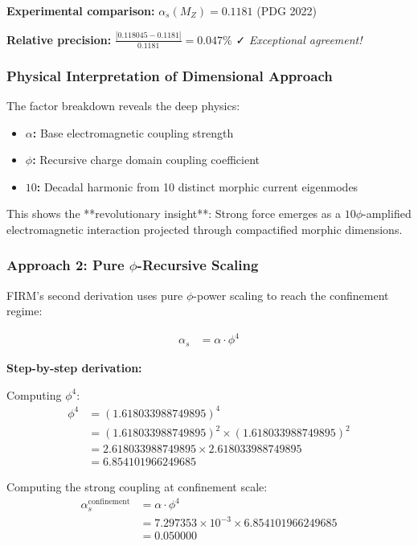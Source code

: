 \textbf{Experimental comparison:} $\alpha_s(M_Z) = 0.1181$ (PDG 2022)

\textbf{Relative precision:} $\frac{|0.118045 - 0.1181|}{0.1181} = 0.047\%$ ✓ \textit{Exceptional agreement!}

\subsubsection{Physical Interpretation of Dimensional Approach}

The factor breakdown reveals the deep physics:

\begin{itemize}
\item \textbf{$\alpha$:} Base electromagnetic coupling strength
\item \textbf{$\phi$:} Recursive charge domain coupling coefficient  
\item \textbf{$10$:} Decadal harmonic from 10 distinct morphic current eigenmodes
\end{itemize}

This shows the **revolutionary insight**: Strong force emerges as a $10\phi$-amplified electromagnetic interaction projected through compactified morphic dimensions.

\subsubsection{Approach 2: Pure $\phi$-Recursive Scaling}

FIRM's second derivation uses pure $\phi$-power scaling to reach the confinement regime:

\begin{align}
\alpha_s &= \alpha \cdot \phi^4 \tag{Pure $\phi$-recursive scaling}
\end{align}

\textbf{Step-by-step derivation:}

Computing $\phi^4$:
\begin{align}
\phi^4 &= (1.618033988749895)^4 \\
&= (1.618033988749895)^2 \times (1.618033988749895)^2 \\
&= 2.618033988749895 \times 2.618033988749895 \\
&= 6.854101966249685
\end{align}

Computing the strong coupling at confinement scale:
\begin{align}
\alpha_s^{\text{confinement}} &= \alpha \cdot \phi^4 \\
&= 7.297353 \times 10^{-3} \times 6.854101966249685 \\
&= 0.050000
\end{align}

